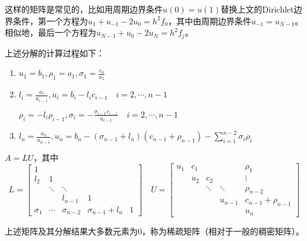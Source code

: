 \documentclass{ctexart}
\begin{document}
这样的矩阵是常见的，比如用周期边界条件$u(0)=u(1)$替换上文的Dirichlet边界条件，第一个方程为$u_1+u_{-1}-2u_0=h^2f_0$，其中由周期边界条件$u_{-1}=u_{N-1}$。相似地，最后一个方程为$u_{N-1}+u_0-2u_{N}=h^2f_j$。

上述分解的计算过程如下：
\begin{enumerate}
\item $u_1=b_1,\rho_1=a_1,\sigma_1=\frac{c_n}{u_1}$
\item $l_i=\frac{a_i}{u_{i-1}},u_i=b_i-l_ic_{i-1}\quad i=2,\cdots, n-1$

$\rho_i=-l_i\rho_{i-1},\sigma_i=-\frac{\sigma_{i-1}c_{i-1}}{u_{i-1}}\quad i=2,\cdots,n-1$
\item $l_n=\frac{a_n}{u_{n-1}},u_n=b_n-(\sigma_{n-1}+l_n)(c_{n-1}+\rho_{n-1})-\sum\limits_{i=1}^{n-2}\sigma_i\rho_i$
\end{enumerate}

$A=LU$，其中
\[L=
\begin{bmatrix}
1&&&&\\
l_2&1&&&\\
&\ddots&\ddots&&\\
&&l_{n-1}&1&\\
\sigma_1&\cdots&\sigma_{n-2}&\sigma_{n-1}+l_n&1
\end{bmatrix}\quad
U=
\begin{bmatrix}
u_1&c_1&&&\rho_1\\
&u_2&c_2&&\vdots\\
&&\ddots&\ddots&\rho_{n-2}\\
&&&u_{n-1}&c_{n-1}+\rho_{n-1}\\
&&&&u_n
\end{bmatrix}\]

上述矩阵及其分解结果大多数元素为0，称为稀疏矩阵（相对于一般的稠密矩阵）。
\end{document}
